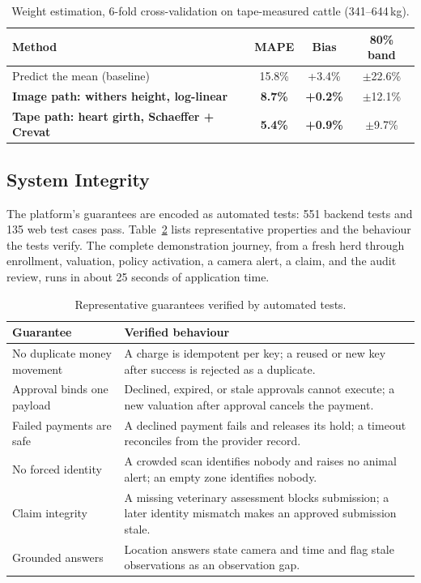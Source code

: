 \documentclass[11pt,letterpaper]{article}
\begin{document}
\begin{table}[H]
\centering
\caption{Weight estimation, 6-fold cross-validation on tape-measured cattle (341--644\,kg).}
\label{tab:weight}
\small
\begin{tabular}{lccc}
\toprule
Method & MAPE & Bias & 80\% band \\
\midrule
Predict the mean (baseline) & 15.8\% & +3.4\% & $\pm$22.6\% \\
\textbf{Image path: withers height, log-linear} & \textbf{8.7\%} & \textbf{+0.2\%} & $\pm$12.1\% \\
\textbf{Tape path: heart girth, Schaeffer + Crevat} & \textbf{5.4\%} & \textbf{+0.9\%} & $\pm$9.7\% \\
\bottomrule
\end{tabular}
\end{table}

\subsection{System Integrity}

The platform's guarantees are encoded as automated tests: 551 backend tests and 135 web test cases pass. Table~\ref{tab:guarantees} lists representative properties and the behaviour the tests verify. The complete demonstration journey, from a fresh herd through enrollment, valuation, policy activation, a camera alert, a claim, and the audit review, runs in about 25 seconds of application time.

\begin{table}[H]
\centering
\caption{Representative guarantees verified by automated tests.}
\label{tab:guarantees}
\small
\begin{tabularx}{\textwidth}{>{\raggedright\arraybackslash}p{4.6cm}X}
\toprule
Guarantee & Verified behaviour \\
\midrule
No duplicate money movement & A charge is idempotent per key; a reused or new key after success is rejected as a duplicate. \\
Approval binds one payload & Declined, expired, or stale approvals cannot execute; a new valuation after approval cancels the payment. \\
Failed payments are safe & A declined payment fails and releases its hold; a timeout reconciles from the provider record. \\
No forced identity & A crowded scan identifies nobody and raises no animal alert; an empty zone identifies nobody. \\
Claim integrity & A missing veterinary assessment blocks submission; a later identity mismatch makes an approved submission stale. \\
Grounded answers & Location answers state camera and time and flag stale observations as an observation gap. \\
\bottomrule
\end{tabularx}
\end{table}
\end{document}
